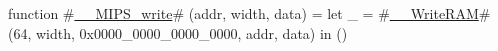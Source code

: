 function #\hyperref[sailMIPSzzyzyMIPSzywrite]{\_\_MIPS\_write}# (addr, width, data) = let _ = #\hyperref[sailMIPSzzyzyWriteRAM]{\_\_WriteRAM}#(64, width, 0x0000_0000_0000_0000, addr, data) in ()
